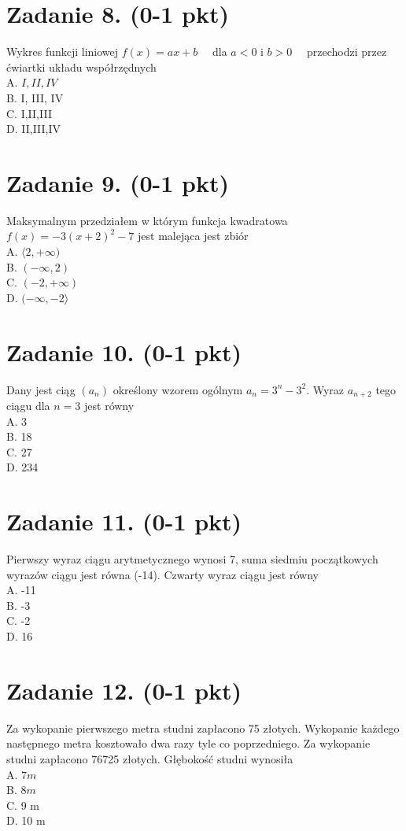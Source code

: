 \documentclass[10pt]{article}
\begin{document}
\section*{Zadanie 8. (0-1 pkt)}
Wykres funkcji liniowej \(f(x)=a x+b \quad\) dla \(a<0\) i \(b>0 \quad\) przechodzi przez ćwiartki układu współrzędnych\\
A. \(I, I I, I V\)\\
B. I, III, IV\\
C. I,II,III\\
D. II,III,IV

\section*{Zadanie 9. (0-1 pkt)}
Maksymalnym przedziałem w którym funkcja kwadratowa \(f(x)=-3(x+2)^{2}-7\) jest malejąca jest zbiór\\
A. \(\langle 2,+\infty)\)\\
B. \((-\infty, 2)\)\\
C. \((-2,+\infty)\)\\
D. \((-\infty,-2\rangle\)

\section*{Zadanie 10. (0-1 pkt)}
Dany jest ciąg \(\left(a_{n}\right)\) określony wzorem ogólnym \(a_{n}=3^{n}-3^{2}\). Wyraz \(a_{n+2}\) tego ciągu dla \(n=3\) jest równy\\
A. 3\\
B. 18\\
C. 27\\
D. 234

\section*{Zadanie 11. (0-1 pkt)}
Pierwszy wyraz ciągu arytmetycznego wynosi 7, suma siedmiu początkowych wyrazów ciągu jest równa (-14). Czwarty wyraz ciągu jest równy\\
A. -11\\
B. -3\\
C. -2\\
D. 16

\section*{Zadanie 12. (0-1 pkt)}
Za wykopanie pierwszego metra studni zapłacono 75 złotych. Wykopanie każdego następnego metra kosztowało dwa razy tyle co poprzedniego. Za wykopanie studni zapłacono 76725 złotych. Głębokość studni wynosiła\\
A. \(7 m\)\\
B. \(8 m\)\\
C. 9 m\\
D. 10 m
\end{document}
